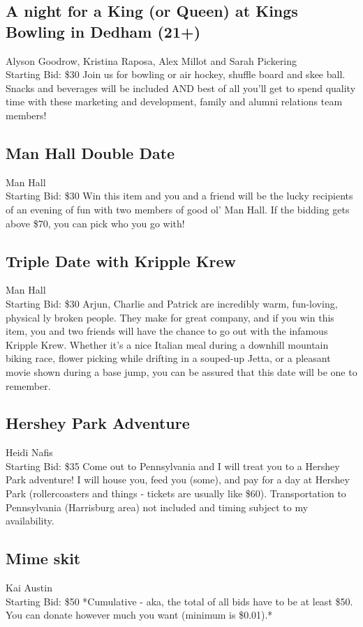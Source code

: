 \documentclass[11pt]{article}
\begin{document}
\subsection{A night for a King (or Queen) at Kings Bowling in Dedham (21+)}
Alyson Goodrow, Kristina Raposa, Alex Millot and Sarah Pickering
\\
Starting Bid: \$30
\newline
Join us for bowling or air hockey, shuffle board and skee ball. Snacks and beverages will be included AND best of all you'll get to spend quality time with these marketing and development, family and alumni relations team members!
\subsection{Man Hall Double Date}
Man Hall
\\
Starting Bid: \$30
\newline
Win this item and you and a friend will be the lucky recipients of an evening of fun with two members of good ol' Man Hall. If the bidding gets above \$70, you can pick who you go with!
\subsection{Triple Date with Kripple Krew}
Man Hall
\\
Starting Bid: \$30
\newline
Arjun, Charlie and Patrick are incredibly warm, fun-loving, physical ly broken people. They make for great company, and if you win this item, you and two friends will have the chance to go out with the infamous Kripple Krew. Whether it's a nice Italian meal during a downhill mountain biking race, flower picking while drifting in a souped-up Jetta, or a pleasant movie shown during a base jump, you can be assured that this date will be one to remember.
\subsection{Hershey Park Adventure}
Heidi Nafis
\\
Starting Bid: \$35
\newline
Come out to Pennsylvania and I will treat you to a Hershey Park adventure! I will house you, feed you (some), and pay for a day at Hershey Park (rollercoasters and things - tickets are usually like \$60). Transportation to Pennsylvania (Harrisburg area) not included and timing subject to my availability.
\subsection{Mime skit}
Kai Austin
\\
Starting Bid: \$50
\newline
*Cumulative - aka, the total of all bids have to be at least \$50. You can donate however much you want (minimum is \$0.01).*
\end{document}
